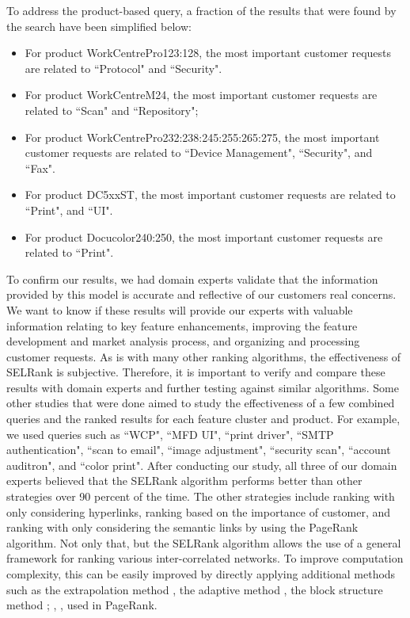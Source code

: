 \documentclass[sigconf]{acmart}
\begin{document}
To address the product-based query, a fraction of the results that were found by the search have been simplified below: 

\begin{itemize}
    \item For product WorkCentrePro123:128, the most important customer requests are related to ``Protocol" and ``Security".
    \item For product WorkCentreM24, the most important customer requests are related to ``Scan" and ``Repository";
    \item For product WorkCentrePro232:238:245:255:265:275, the most important customer requests are related to ``Device Management", ``Security", and ``Fax".
    \item For product DC5xxST, the most important customer requests are related to ``Print", and ``UI". 
    \item For product Docucolor240:250, the most important customer requests are related to ``Print".
\end{itemize}
To confirm our results, we had domain experts validate that the information provided by this model is accurate and reflective of our customers real concerns. We want to know if these results will provide our experts with valuable information relating to key feature enhancements, improving the feature development and market analysis process, and organizing and processing customer requests. As is with many other ranking algorithms, the effectiveness of SELRank is subjective. Therefore, it is important to verify and compare these results with domain experts and further testing against similar algorithms. Some other studies that were done aimed to study the effectiveness of a few combined queries and the ranked results for each feature cluster and product. For example, we used queries such as ``WCP", ``MFD UI", ``print driver", ``SMTP authentication", ``scan to email", ``image adjustment", ``security scan", ``account auditron", and ``color print". After conducting our study, all three of our domain experts believed that the SELRank algorithm performs better than other strategies over 90 percent of the time. The other strategies include ranking with only considering hyperlinks, ranking based on the importance of customer, and ranking with only considering the semantic links by using the PageRank algorithm. Not only that, but the SELRank algorithm allows the use of a general framework for ranking various inter-correlated networks. To improve computation complexity, this can be easily improved by directly applying additional methods such as the extrapolation method \cite{Kamvar:2003:EMA:775152.775190}, the adaptive method \cite{Kamvar:2003:EMA:775152.775190}, the block structure method \cite{Broder:2004:EPA:1013367.1013537}; \cite{Kamvar:2003:EMA:775152.775190}, \cite{berkhin2005survey}, used in PageRank.
\end{document}
